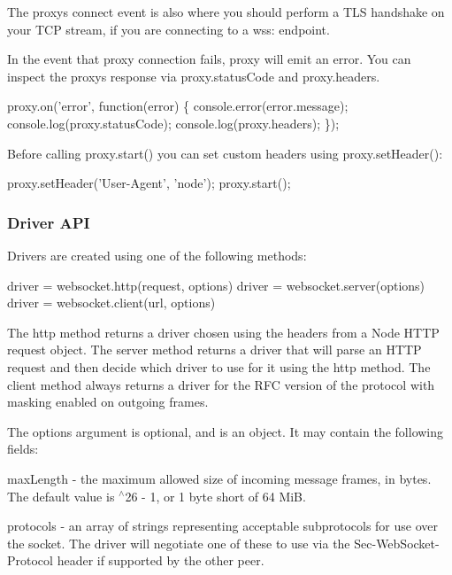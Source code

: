 The proxy\textquotesingle{}s {\ttfamily connect} event is also where you should perform a T\+LS handshake on your T\+CP stream, if you are connecting to a {\ttfamily wss\+:} endpoint.

In the event that proxy connection fails, {\ttfamily proxy} will emit an {\ttfamily error}. You can inspect the proxy\textquotesingle{}s response via {\ttfamily proxy.\+status\+Code} and {\ttfamily proxy.\+headers}.


\begin{DoxyCode}
proxy.on('error', function(error) \{
  console.error(error.message);
  console.log(proxy.statusCode);
  console.log(proxy.headers);
\});
\end{DoxyCode}


Before calling {\ttfamily proxy.\+start()} you can set custom headers using {\ttfamily proxy.\+set\+Header()}\+:


\begin{DoxyCode}
proxy.setHeader('User-Agent', 'node');
proxy.start();
\end{DoxyCode}


\subsubsection*{Driver A\+PI}

Drivers are created using one of the following methods\+:


\begin{DoxyCode}
driver = websocket.http(request, options)
driver = websocket.server(options)
driver = websocket.client(url, options)
\end{DoxyCode}


The {\ttfamily http} method returns a driver chosen using the headers from a Node H\+T\+TP request object. The {\ttfamily server} method returns a driver that will parse an H\+T\+TP request and then decide which driver to use for it using the {\ttfamily http} method. The {\ttfamily client} method always returns a driver for the R\+FC version of the protocol with masking enabled on outgoing frames.

The {\ttfamily options} argument is optional, and is an object. It may contain the following fields\+:


\begin{DoxyItemize}
\item {\ttfamily max\+Length} -\/ the maximum allowed size of incoming message frames, in bytes. The default value is {$^\wedge$26 -\/ 1}, or 1 byte short of 64 MiB.
\item {\ttfamily protocols} -\/ an array of strings representing acceptable subprotocols for use over the socket. The driver will negotiate one of these to use via the {\ttfamily Sec-\/\+Web\+Socket-\/\+Protocol} header if supported by the other peer.
\end{DoxyItemize}

